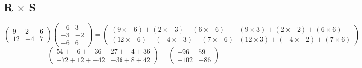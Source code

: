 \documentclass[a4paper,12pt]{article}
\begin{document}
      \subsection{R $\times$ S}
        \begin{equation}
          \begin{pmatrix}
            9 & 2 & 6\\
            12 & -4 & 7
          \end{pmatrix}
          \begin{pmatrix}
            -6 & 3\\
            -3 & -2\\
            -6 & 6
          \end{pmatrix}
          =
          \begin{pmatrix}
            ( 9 \times -6) + ( 2 \times -3) + (6 \times -6) & ( 9 \times 3) + ( 2 \times -2) + (6 \times 6)\\
            (12 \times -6) + (-4 \times -3) + (7 \times -6) & (12 \times 3) + (-4 \times -2) + (7 \times 6)
          \end{pmatrix}
        \end{equation}
        \begin{equation}
          =
          \begin{pmatrix}
             54 + -6 + -36 &  27 + -4 + 36\\
            -72 + 12 + -42 & -36 +  8 + 42
          \end{pmatrix}
          =
          \begin{pmatrix}
             -96 & 59\\
            -102 & -86
          \end{pmatrix}
        \end{equation}
\end{document}
